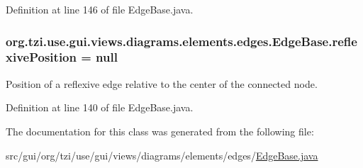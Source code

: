 Definition at line 146 of file Edge\-Base.\-java.

\hypertarget{classorg_1_1tzi_1_1use_1_1gui_1_1views_1_1diagrams_1_1elements_1_1edges_1_1_edge_base_a3c4c59a344fe54ed87f8e637670930b5}{
\subsubsection[{reflexive\-Position}]{ org.\-tzi.\-use.\-gui.\-views.\-diagrams.\-elements.\-edges.\-Edge\-Base.\-reflexive\-Position = null\hspace{0.3cm}{\ttfamily [protected]}}}\label{classorg_1_1tzi_1_1use_1_1gui_1_1views_1_1diagrams_1_1elements_1_1edges_1_1_edge_base_a3c4c59a344fe54ed87f8e637670930b5}
Position of a reflexive edge relative to the center of the connected node. 

Definition at line 140 of file Edge\-Base.\-java.



The documentation for this class was generated from the following file\-:\begin{DoxyCompactItemize}
\item 
src/gui/org/tzi/use/gui/views/diagrams/elements/edges/\hyperlink{_edge_base_8java}{Edge\-Base.\-java}\end{DoxyCompactItemize}
